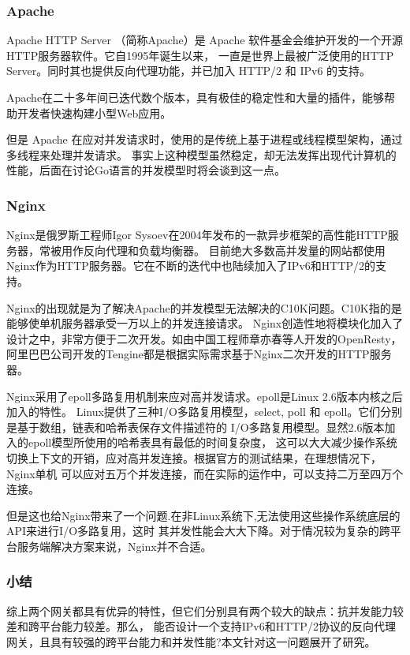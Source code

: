 \documentclass[twoside]{CUGThesis}
\begin{document}
	\subsubsection{Apache}
	Apache HTTP Server （简称Apache）是 Apache 软件基金会维护开发的一个开源HTTP服务器软件。它自1995年诞生以来，
	一直是世界上最被广泛使用的HTTP Server。同时其也提供反向代理功能，并已加入 HTTP/2 和 IPv6 的支持。\par 
	Apache在二十多年间已迭代数个版本，具有极佳的稳定性和大量的插件，能够帮助开发者快速构建小型Web应用。\par
	但是 Apache 在应对并发请求时，使用的是传统上基于进程或线程模型架构，通过多线程来处理并发请求。
	事实上这种模型虽然稳定，却无法发挥出现代计算机的性能，后面在讨论Go语言的并发模型时将会谈到这一点。\par
	\subsubsection{Nginx}
	Nginx是俄罗斯工程师Igor Sysoev在2004年发布的一款异步框架的高性能HTTP服务器，常被用作反向代理和负载均衡器。
	目前绝大多数高并发量的网站都使用Nginx作为HTTP服务器。它在不断的迭代中也陆续加入了IPv6和HTTP/2的支持。\par
	Nginx的出现就是为了解决Apache的并发模型无法解决的C10K问题。C10K指的是能够使单机服务器承受一万以上的并发连接请求。
	Nginx创造性地将模块化加入了设计之中，非常方便于二次开发。如由中国工程师章亦春等人开发的OpenResty，
	阿里巴巴公司开发的Tengine都是根据实际需求基于Nginx二次开发的HTTP服务器。\par
	Nginx采用了epoll多路复用机制来应对高并发请求。epoll是Linux 2.6版本内核之后加入的特性。
	Linux提供了三种I/O多路复用模型，select, poll 和 epoll。它们分别是基于数组，链表和哈希表保存文件描述符的
	I/O多路复用模型。显然2.6版本加入的epoll模型所使用的哈希表具有最低的时间复杂度，
	这可以大大减少操作系统切换上下文的开销，应对高并发连接。根据官方的测试结果，在理想情况下，Nginx单机
	可以应对五万个并发连接，而在实际的运作中，可以支持二万至四万个连接。\par 
	但是这也给Nginx带来了一个问题.在非Linux系统下,无法使用这些操作系统底层的API来进行I/O多路复用，这时
	其并发性能会大大下降。对于情况较为复杂的跨平台服务端解决方案来说，Nginx并不合适。\par 
	\subsubsection{小结}
	综上两个网关都具有优异的特性，但它们分别具有两个较大的缺点：抗并发能力较差和跨平台能力较差。那么，
	能否设计一个支持IPv6和HTTP/2协议的反向代理网关，且具有较强的跨平台能力和并发性能?本文针对这一问题展开了研究。\par 
\end{document}
